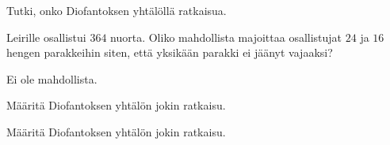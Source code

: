 \begin{tehtavasivu}

\begin{tehtava}
    Tutki, onko Diofantoksen yhtälöllä ratkaisua.
    

    \begin{vastaus}
    \end{vastaus}
    
\end{tehtava}

\begin{tehtava}
    Leirille osallistui $364$ nuorta. Oliko mahdollista majoittaa osallistujat $24$ ja $16$ hengen parakkeihin siten, että yksikään parakki ei jäänyt vajaaksi?
    
    \begin{vastaus}
        Ei ole mahdollista.
    \end{vastaus}
    
\end{tehtava}

\begin{tehtava}
    Määritä Diofantoksen yhtälön jokin ratkaisu.
    

    \begin{vastaus}
    \end{vastaus}
    
\end{tehtava}

\begin{tehtava}
    Määritä Diofantoksen yhtälön jokin ratkaisu.
    

    \begin{vastaus}
    \end{vastaus}
    
\end{tehtava}


\end{tehtavasivu}
